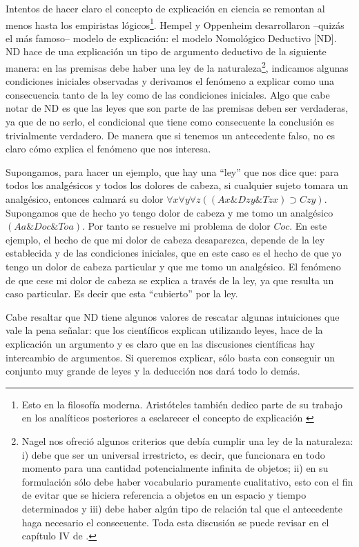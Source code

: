 Intentos de hacer claro el concepto de explicación en ciencia se remontan al menos hasta los empiristas lógicos\footnote{Esto en la filosofía moderna. Aristóteles también dedico parte de su trabajo en los analíticos posteriores a esclarecer el concepto de explicación \cite{Aristoteles2009}}. Hempel y Oppenheim desarrollaron --quizás el más famoso-- modelo de explicación: el modelo Nomológico Deductivo [ND]. ND hace de una explicación un tipo de argumento deductivo de la siguiente manera: en las premisas debe haber una ley de la naturaleza\footnote{Nagel nos ofreció algunos criterios que debía cumplir una ley de la naturaleza: i) debe que ser un universal irrestricto, es decir, que funcionara en todo momento para una cantidad potencialmente infinita de objetos; ii) en su formulación sólo debe haber vocabulario puramente cualitativo, esto con el fin de evitar que se hiciera referencia a objetos en un espacio y tiempo determinados y iii) debe haber algún tipo de relación tal que el antecedente haga necesario el consecuente. Toda esta discusión se puede revisar en el capítulo IV de \cite{Nagel2006}.}, indicamos algunas condiciones iniciales observadas y derivamos el fenómeno a explicar como una consecuencia tanto de la ley como de las condiciones iniciales. Algo que cabe notar de ND es que las leyes que son parte de las premisas deben ser verdaderas, ya que de no serlo, el condicional que tiene como consecuente la conclusión es trivialmente verdadero. De manera que si tenemos un antecedente falso, no es claro cómo explica el fenómeno que nos interesa.

Supongamos, para hacer un ejemplo, que hay una ``ley'' que nos dice que: para todos los analgésicos y todos los dolores de cabeza, si cualquier sujeto tomara un analgésico, entonces calmará su dolor $\forall{x}\forall{y}\forall{z}((Ax\&Dzy\&Tzx)\supset Czy)$. Supongamos que de hecho yo tengo dolor de cabeza y me tomo un analgésico $(Aa \& Doc \& Toa)$. Por tanto se resuelve mi problema de dolor $Coc$. En este ejemplo, el hecho de que mi dolor de cabeza desaparezca, depende de la ley establecida y de las condiciones iniciales, que en este caso es el hecho de que yo tengo un dolor de cabeza particular y que me tomo un analgésico. El fenómeno de que cese mi dolor de cabeza se explica a través de la ley, ya que resulta un caso particular. Es decir que esta ``cubierto'' por la ley.

Cabe resaltar que ND tiene algunos valores de rescatar algunas intuiciones que vale la pena señalar: que los científicos explican utilizando leyes, hace de la explicación un argumento y es claro que en las discusiones científicas hay intercambio de argumentos. Si queremos explicar, sólo basta con conseguir un conjunto muy grande de leyes y la deducción nos dará todo lo demás.

